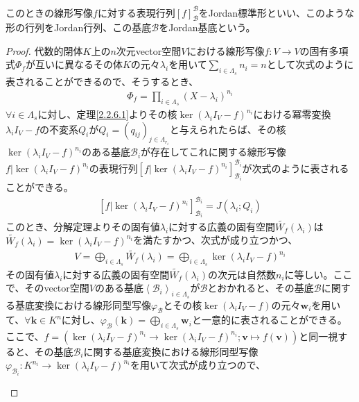 \documentclass[dvipdfmx]{jsarticle}
\begin{document}
\begin{dfn}
このときの線形写像$f$に対する表現行列$[ f]_{\mathcal{B}}^{\mathcal{B}}$をJordan標準形といい、このような形の行列をJordan行列、この基底$\mathcal{B}$をJordan基底という。
\end{dfn}
\begin{proof}
代数的閉体$K$上の$n$次元vector空間$V$における線形写像$f:V \rightarrow V$の固有多項式$\varPhi_{f}$が互いに異なるその体$K$の元々$\lambda_{i}$を用いて$\sum_{i \in \varLambda_{s}} n_{i} = n$として次式のように表されることができるので、そうするとき、
\begin{align*}
\varPhi_{f} = \prod_{i \in \varLambda_{s}} \left( X - \lambda_{i} \right)^{n_{i}}
\end{align*}
$\forall i \in \varLambda_{s}$に対し、定理\ref{2.2.6.1}よりその核$\ker\left( \lambda_{i}I_{V} - f \right)^{n_{i}}$における冪零変換$\lambda_{i}I_{V} - f$の不変系$Q_{i}$が$Q_{i} = \left( q_{ij} \right)_{j \in \varLambda_{r_{i}}}$と与えられたらば、その核$\ker\left( \lambda_{i}I_{V} - f \right)^{n_{i}}$のある基底$\mathcal{B}_{i}$が存在してこれに関する線形写像$f|\ker\left( \lambda_{i}I_{V} - f \right)^{n_{i}}$の表現行列$\left[ f|\ker\left( \lambda_{i}I_{V} - f \right)^{n_{i}} \right]_{\mathcal{B}_{i}}^{\mathcal{B}_{i}}$が次式のように表されることができる。
\begin{align*}
\left[ f|\ker\left( \lambda_{i}I_{V} - f \right)^{n_{i}} \right]_{\mathcal{B}_{i}}^{\mathcal{B}_{i}} = J\left( \lambda_{i};Q_{i} \right)
\end{align*}
このとき、分解定理よりその固有値$\lambda_{i}$に対する広義の固有空間$\widetilde{W_{f}}\left( \lambda_{i} \right)$は$\widetilde{W_{f}}\left( \lambda_{i} \right) = \ker\left( \lambda_{i}I_{V} - f \right)^{n_{i}}$を満たすかつ、次式が成り立つかつ、
\begin{align*}
V = \bigoplus_{i \in \varLambda_{s}} {\widetilde{W_{f}}\left( \lambda_{i} \right)} = \bigoplus_{i \in \varLambda_{s}} {\ker\left( \lambda_{i}I_{V} - f \right)^{n_{i}}}
\end{align*}
その固有値$\lambda_{i}$に対する広義の固有空間$\widetilde{W_{f}}\left( \lambda_{i} \right)$の次元は自然数$n_{i}$に等しい。ここで、そのvector空間$V$のある基底$\left\langle \mathcal{B}_{i} \right\rangle_{i \in \varLambda_{s}}$が$\mathcal{B}$とおかれると、その基底$\mathcal{B}$に関する基底変換における線形同型写像$\varphi_{\mathcal{B}}$とその核$\ker\left( \lambda_{i}I_{V} - f \right)$の元々$\mathbf{w}_{i}$を用いて、$\forall\mathbf{k} \in K^{n}$に対し、$\varphi_{\mathcal{B}}\left( \mathbf{k} \right) = \bigoplus_{i \in \varLambda_{s}} \mathbf{w}_{i}$と一意的に表されることができる。ここで、$f = \left( \ker\left( \lambda_{i}I_{V} - f \right)^{n_{i}} \rightarrow \ker\left( \lambda_{i}I_{V} - f \right)^{n_{i}};\mathbf{v} \mapsto f\left( \mathbf{v} \right) \right)$と同一視すると、その基底$\mathcal{B}_{i}$に関する基底変換における線形同型写像$\varphi_{\mathcal{B}_{i}}:K^{n_{i}} \rightarrow \ker\left( \lambda_{i}I_{V} - f \right)^{n_{i}}$を用いて次式が成り立つので、
\begin{center}
  \begin{tikzpicture}[auto]


\end{tikzpicture}
\end{center}
\end{proof}
\end{document}
